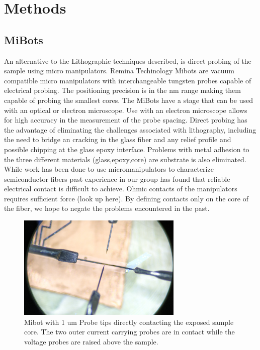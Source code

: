 \chapter{Methods}
\section{}
\section{MiBots}
An alternative to the Lithographic techniques described, is direct probing of the sample using micro manipulators. Remina Techinology Mibots are vacuum compatible micro manipulators with interchangeable tungsten probes capable of electrical probing. The positioning precision is in the nm range making them capable of probing the smallest cores. The MiBots have a stage that can be used with an optical or electron microscope. Use with an electron microscope allows for high accuracy in the measurement of the probe spacing. Direct probing has the advantage of eliminating the challenges associated with lithography, including the need to bridge an cracking in the glass fiber and any relief profile and possible chipping at the glass epoxy interface. Problems with metal adhesion to the three different materials (glass,epoxy,core) are substrate is also eliminated. While work has been done to use micromanipulators to characterize semiconductor fibers \cite{Engel2016DirectPhotosynthesis} past experience in our group has found that reliable electrical contact is difficult to achieve. Ohmic contacts of the manipulators requires sufficient force (look up here). By defining contacts only on the core of the fiber, we hope to negate the problems encountered in the past. 

\begin{figure}[t]
  \centering
    \includegraphics[width=0.7\textwidth]{fig/MiBots/IMG_20190409_143016.jpg}
 \caption{ Mibot with 1 um Probe tips directly contacting the exposed sample core. The two outer current carrying probes are in contact while the voltage probes are raised above the sample.}
\label{mibot}
\end{figure}

